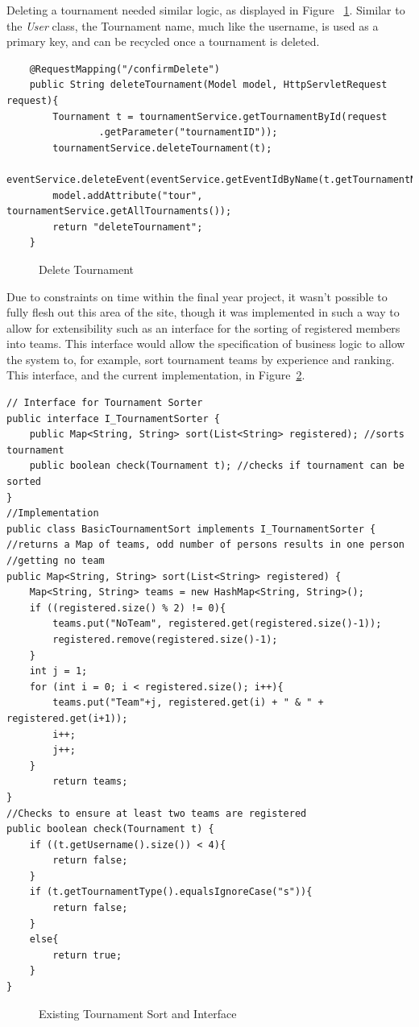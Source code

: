 Deleting a tournament needed similar logic, as displayed in Figure ~\ref{fig:deleteTour}. Similar to the \textit{User} class, the Tournament name, much like the username, is used as a primary key, and can be recycled once a tournament is deleted. 

\begin{lstlisting}
	@RequestMapping("/confirmDelete")
	public String deleteTournament(Model model, HttpServletRequest request){
		Tournament t = tournamentService.getTournamentById(request
				.getParameter("tournamentID"));
		tournamentService.deleteTournament(t);
		eventService.deleteEvent(eventService.getEventIdByName(t.getTournamentName()));
		model.addAttribute("tour", tournamentService.getAllTournaments());
		return "deleteTournament";
	}
\end{lstlisting}
\begin{figure}[H]
\caption{Delete Tournament}
\label{fig:deleteTour}
\end{figure}	

Due to constraints on time within the final year project, it wasn't possible to fully flesh out this area of the site, though it was implemented in such a way to allow for extensibility such as an interface for the sorting of registered members into teams. This interface would allow the specification of business logic to allow the system to, for example, sort tournament teams by experience and ranking. This interface, and the current implementation, in Figure~\ref{fig:tsort}.

\begin{lstlisting}
// Interface for Tournament Sorter
public interface I_TournamentSorter {
	public Map<String, String> sort(List<String> registered); //sorts tournament
	public boolean check(Tournament t); //checks if tournament can be sorted
}
//Implementation
public class BasicTournamentSort implements I_TournamentSorter {
//returns a Map of teams, odd number of persons results in one person
//getting no team
public Map<String, String> sort(List<String> registered) {
	Map<String, String> teams = new HashMap<String, String>();		
	if ((registered.size() % 2) != 0){
		teams.put("NoTeam", registered.get(registered.size()-1));
		registered.remove(registered.size()-1);
	}
	int j = 1;
	for (int i = 0; i < registered.size(); i++){
		teams.put("Team"+j, registered.get(i) + " & " + registered.get(i+1));
		i++;
		j++;
	}
		return teams;
}
//Checks to ensure at least two teams are registered
public boolean check(Tournament t) {
	if ((t.getUsername().size()) < 4){
		return false;
	}
	if (t.getTournamentType().equalsIgnoreCase("s")){
		return false;
	}
	else{
		return true;
	}
}
\end{lstlisting}
\begin{figure}[H]
\caption{Existing Tournament Sort and Interface}
\label{fig:tsort}
\end{figure}

